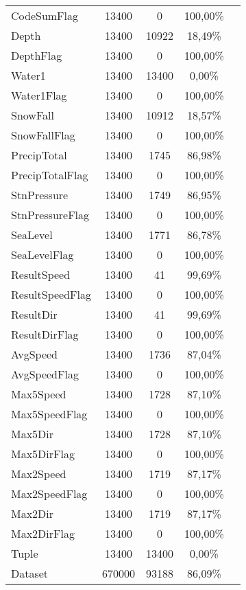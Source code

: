\begin{longtable}{lcccc}
		CodeSumFlag		& 13400 & 0		     & 100,00\% 	\\	
		Depth			& 13400 & 10922		 & 18,49\%  	\\
		DepthFlag		& 13400 & 0		   	 & 100,00\%		\\	
		Water1			& 13400 & 13400		 & 0,00\%		\\
		Water1Flag		& 13400 & 0		   	 & 100,00\%		\\	
		SnowFall		& 13400 & 10912		 & 18,57\%		\\	
		SnowFallFlag	& 13400 & 0		   	 & 100,00\%		\\		
		PrecipTotal		& 13400 & 1745		 & 86,98\%		\\	
		PrecipTotalFlag	& 13400 & 0		   	 & 100,00\%		\\		
		StnPressure		& 13400 & 1749		 & 86,95\%		\\	
		StnPressureFlag	& 13400 & 0		   	 & 100,00\%		\\		
		SeaLevel		& 13400 & 1771		 & 86,78\%		\\	
		SeaLevelFlag	& 13400 & 0		   	 & 100,00\%		\\		
		ResultSpeed		& 13400 & 41		 & 99,69\%		\\	
		ResultSpeedFlag	& 13400 & 0		   	 & 100,00\%		\\		
		ResultDir		& 13400 & 41		 & 99,69\%		\\			
		ResultDirFlag	& 13400 & 0		   	 & 100,00\%		\\		
		AvgSpeed		& 13400 & 1736		 & 87,04\%		\\	
		AvgSpeedFlag	& 13400 & 0		   	 & 100,00\%		\\		
		Max5Speed		& 13400 & 1728		 & 87,10\%		\\	
		Max5SpeedFlag	& 13400 & 0		   	 & 100,00\%		\\		
		Max5Dir			& 13400 & 1728		 & 87,10\%		\\
		Max5DirFlag		& 13400 & 0		   	 & 100,00\%		\\	
		Max2Speed		& 13400 & 1719		 & 87,17\%		\\	
		Max2SpeedFlag	& 13400 & 0		   	 & 100,00\%		\\		
		Max2Dir			& 13400 & 1719		 & 87,17\%		\\
		Max2DirFlag		& 13400 & 0		   	 & 100,00\%		\\	
		\midrule
		Tuple 			& 13400  &	13400	 & 0,00\%		\\
		Dataset  		& 670000 &	93188 	 & 86,09\%		\\
		\bottomrule
		
	\end{longtable}
	\label{tab:completezza weather}

